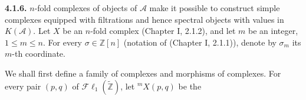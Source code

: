 \medskip\noindent\textbf{4.1.6.}\quad
$n$-fold complexes of objects of $\mathcal A$ make it possible to construct
simple complexes equipped with filtrations and hence spectral objects with
values in $K(\mathcal A)$. Let $X$ be an $n$-fold complex (Chapter I,
2.1.2), and let $m$ be an integer, $1\leq m\leq n$. For every
$\sigma\in\mathbb Z[n]$ (notation of (Chapter I, 2.1.1)), denote by
$\sigma_m$ its $m$-th coordinate.

We shall first define a family of complexes and morphisms of complexes. For
every pair $(p,q)$ of $\mathcal{F}\ell_1(\widetilde{\mathbb Z})$, let
${}^{m}X(p,q)$ be the
\endgroup
